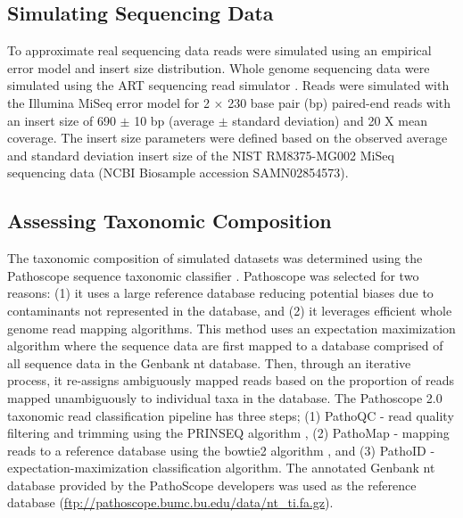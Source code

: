 \documentclass[fleqn,10pt,lineno]{wlpeerj}\usepackage[]{graphicx}\usepackage[]{color}
\begin{document}
\subsection*{Simulating Sequencing Data}
To approximate real sequencing data reads were simulated using an empirical error model and insert size distribution.
Whole genome sequencing data were simulated using the ART sequencing read simulator \citep{Huang2012}.
Reads were simulated with the Illumina MiSeq error model for 2 $\times$ 230 base pair (bp) paired-end reads with an insert size of 690 $\pm$ 10 bp (average $\pm$ standard deviation) and 20 X mean coverage.
The insert size parameters were defined based on the observed average and standard deviation insert size of the NIST RM8375-MG002 MiSeq sequencing data \citep{olson2016pepr} (NCBI Biosample accession SAMN02854573).

\subsection*{Assessing Taxonomic Composition}
The taxonomic composition of simulated datasets was determined using the Pathoscope sequence taxonomic classifier \citep{Francis2013}.
Pathoscope was selected for two reasons: (1) it uses a large reference database reducing potential biases due to contaminants not represented in the database, and (2) it leverages efficient whole genome read mapping algorithms.
This method uses an expectation maximization algorithm where the sequence data are first mapped to a database comprised of all sequence data in the Genbank nt database.
Then, through an iterative process, it re-assigns ambiguously mapped reads based on the proportion of reads mapped unambiguously to individual taxa in the database.
The Pathoscope 2.0 taxonomic read classification pipeline has three steps; (1) PathoQC - read quality filtering and trimming using the PRINSEQ algorithm \citep{schmieder2011quality}, (2) PathoMap - mapping reads to a reference database using the bowtie2 algorithm \citep{Langmead2012}, and (3) PathoID - expectation-maximization classification algorithm.
The annotated Genbank nt database provided by the PathoScope developers was used as the reference database (\url{ftp://pathoscope.bumc.bu.edu/data/nt\_ti.fa.gz}).
\end{document}

